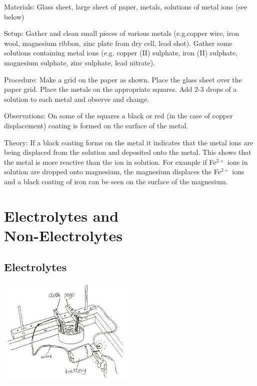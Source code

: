 \begin{multicols}{2}
\begin{description*}
\item[Materials:]{Glass sheet, large sheet of paper, metals, solutions of metal ions (see below)}
\item[Setup:]{Gather and clean small pieces of various metals (e.g.copper wire, iron wool, magnesium ribbon, zinc plate from dry cell, lead shot). Gather some solutions containing metal ions (e.g. copper (II) sulphate, iron (II) sulphate, magnesium sulphate, zinc sulphate, lead nitrate).}
\item[Procedure:]{Make a grid on the paper as shown. Place the glass sheet over the paper grid. Place the metals on the appropriate squares. Add 2-3 drops of a solution to each metal and observe and change.}
\item[Observations:]{On some of the squares a black or red (in the
case of copper displacement) coating is formed
on the surface of the metal.}
\item[Theory:]{If a black coating forms on the metal it indicates that the metal ions are being displaced from the solution and deposited onto the metal. This shows that the metal is more reactive than the ion in solution. For example if Fe$^{2+}$ ions in
solution are dropped onto magnesium, the
magnesium displaces the Fe$^{2+}$ ions and a black
coating of iron can be seen on the surface of the
magnesium.}
\end{description*}

\columnbreak


\section*{Electrolytes and \hfill \\ Non-Electrolytes} 


\subsection{Electrolytes}

\begin{center}
\includegraphics[width=0.49\textwidth]{./img/source/electrolytes.jpg}
\end{center}


\end{multicols}
